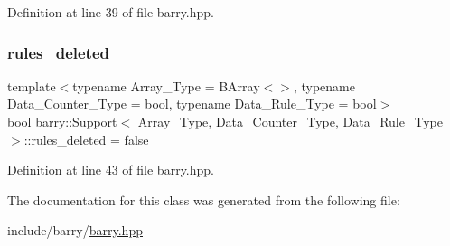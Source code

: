 Definition at line 39 of file barry.\+hpp.

\mbox{\label{classbarry_1_1_support_ab06f3a207f1d647d327a815bcedba9dd}} 
\subsubsection{\texorpdfstring{rules\+\_\+deleted}{rules\_deleted}}
{\footnotesize\ttfamily template$<$typename Array\+\_\+\+Type = B\+Array$<$$>$, typename Data\+\_\+\+Counter\+\_\+\+Type = bool, typename Data\+\_\+\+Rule\+\_\+\+Type = bool$>$ \\
bool \hyperlink{classbarry_1_1_support}{barry\+::\+Support}$<$ Array\+\_\+\+Type, Data\+\_\+\+Counter\+\_\+\+Type, Data\+\_\+\+Rule\+\_\+\+Type $>$\+::rules\+\_\+deleted = false}



Definition at line 43 of file barry.\+hpp.



The documentation for this class was generated from the following file\+:\begin{DoxyCompactItemize}
\item 
include/barry/\hyperlink{barry_8hpp}{barry.\+hpp}\end{DoxyCompactItemize}
